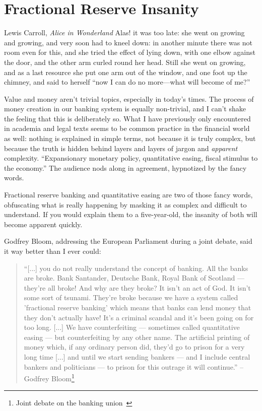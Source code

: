 \chapter{Fractional Reserve Insanity}
\label{les:13}

\begin{chapquote}{Lewis Carroll, \textit{Alice in Wonderland}}
Alas! it was too late: she went on growing and growing, and very soon had to
kneel down: in another minute there was not room even for this, and she tried
the effect of lying down, with one elbow against the door, and the other arm
curled round her head. Still she went on growing, and as a last resource she put
one arm out of the window, and one foot up the chimney, and said to herself
\enquote{now I can do no more—what will become of me?}
\end{chapquote}

Value and money aren't trivial topics, especially in today's times. The
process of money creation in our banking system is equally non-trivial,
and I can't shake the feeling that this is deliberately so. What I have
previously only encountered in academia and legal texts seems to be
common practice in the financial world as well: nothing is explained in
simple terms, not because it is truly complex, but because the truth is
hidden behind layers and layers of jargon and \textit{apparent} complexity.
\enquote{Expansionary monetary policy, quantitative easing, fiscal stimulus to
the economy.} The audience nods along in agreement, hypnotized by the
fancy words.

Fractional reserve banking and quantitative easing are two of those
fancy words, obfuscating what is really happening by masking it as
complex and difficult to understand. If you would explain them to a
five-year-old, the insanity of both will become apparent quickly.

Godfrey Bloom, addressing the European Parliament during a joint
debate, said it way better than I ever could:

\begin{samepage}\begin{quotation}
\enquote{[...] you do not really understand the concept of banking. All the
banks are broke. Bank Santander, Deutsche Bank, Royal Bank of
Scotland --- they're all broke! And why are they broke? It isn't an
act of God. It isn't some sort of tsunami. They're broke because we
have a system called 'fractional reserve banking' which means that
banks can lend money that they don't actually have! It's a criminal
scandal and it's been going on for too long. [...]
We have counterfeiting --- sometimes called quantitative
easing --- but counterfeiting by any other name. The artificial
printing of money which, if any ordinary person did, they'd go to
prison for a very long time [...] and until we start sending
bankers --- and I include central bankers and politicians --- to
prison for this outrage it will continue.}
\flushright -- Godfrey Bloom\footnote{Joint debate on the
banking union~\cite{godfrey-bloom}}
\end{quotation}\end{samepage}

